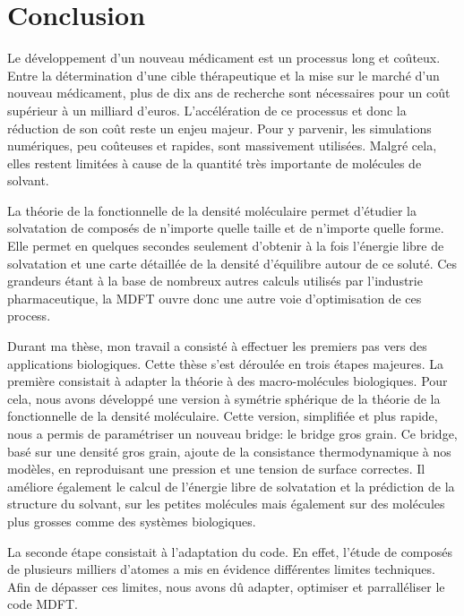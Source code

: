 \chapter{Conclusion}
\label{chap:conclusion}
Le développement d'un nouveau médicament est un processus long et co\^uteux. Entre la détermination d'une cible thérapeutique et la mise sur le marché d'un nouveau médicament, plus de dix ans de recherche sont nécessaires pour un coût supérieur à un milliard d'euros.
L'accélération de ce processus et donc la réduction de son coût reste un enjeu majeur. Pour y parvenir, les simulations numériques, peu co\^uteuses et rapides, sont massivement utilisées. Malgré cela, elles restent limitées à cause de la quantité très importante de molécules de solvant.


La théorie de la fonctionnelle de la densité moléculaire permet d'étudier la solvatation de composés de n'importe quelle taille et de n'importe quelle forme. Elle permet en quelques secondes seulement d'obtenir à la fois l'énergie libre de solvatation et une carte détaillée de la densité d'équilibre autour de ce soluté.
Ces grandeurs étant à la base de nombreux autres calculs utilisés par l'industrie pharmaceutique, la MDFT ouvre donc une autre voie d'optimisation de ces process.


Durant ma thèse, mon travail a consisté à effectuer les premiers pas vers des applications biologiques. Cette thèse s'est déroulée en trois étapes majeures. La première consistait à adapter la théorie à des macro-molécules biologiques. Pour cela, nous avons développé une version à symétrie sphérique de la théorie de la fonctionnelle de la densité moléculaire. Cette version, simplifiée et plus rapide, nous a permis de paramétriser un nouveau bridge: le bridge gros grain.
Ce bridge, basé sur une densité gros grain, ajoute de la consistance thermodynamique à nos modèles, en reproduisant une pression et une tension de surface correctes. Il améliore également le calcul de l’énergie libre de solvatation et la prédiction de la structure du solvant, sur les petites molécules mais également sur des molécules plus grosses comme des systèmes biologiques.


La seconde étape consistait à l'adaptation du code. En effet, l'étude de composés de plusieurs milliers d'atomes a mis en évidence différentes limites techniques. Afin de dépasser ces limites, nous avons dû adapter, optimiser et parralléliser le code MDFT.


